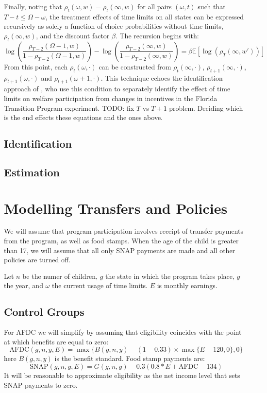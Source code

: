 \documentclass[12pt]{article}
\newcommand\EE{\mathbb{E}}
\numberwithin{equation}{section}
\numberwithin{figure}{section}
\numberwithin{table}{section}
\begin{document}
Finally, noting that $\rho_t(\omega,w) = \rho_t(\infty,w)$ for all pairs $(\omega,t)$ such that $T-t\leq\Omega-\omega$, the treatment effects of time limits on all states can be expressed recursively as solely a function of choice probabilities without time limits, $\rho_t(\infty,w)$, and the discount factor $\beta$. The recursion begins with:
\[
\log\left(\frac{\rho_{T-2}(\Omega-1,w)}{1-\rho_{T-2}(\Omega-1,w)}\right)-\log\left(\frac{\rho_{T-2}(\infty,w)}{1-\rho_{T-2}(\infty,w)}\right) = \beta\EE[\log(\rho_{T}(\infty,w'))]
\]
From this point, each $\rho_{t}(\omega,\cdot)$ can be constructed from $\rho_{t}(\infty,\cdot)$, $\rho_{t+1}(\infty,\cdot)$, $\rho_{t+1}(\omega,\cdot)$ and $\rho_{t+1}(\omega+1,\cdot)$.
This technique echoes the identification approach of \cite{GroggerMichal2003}, who use this condition to separately identify the effect of time limits on welfare participation from changes in incentives in the Florida Transition Program experiment.
{\color{red} TODO: fix $T$ vs $T+1$ problem. Deciding which is the end effects these equations and the ones above. }


\subsection{Identification}

\subsection{Estimation}

\section{Modelling Transfers and Policies}
We will assume that program participation involves receipt of transfer payments from the program, as well as food stamps. When the age of the child is greater than 17, we will assume that all only SNAP payments are made and all other policies are turned off.

Let $n$ be the numer of children, $g$ the state in which the program takes place, $y$ the year, and $\omega$ the current usage of time limits. $E$ is monthly earnings.

\subsection{Control Groups}
For AFDC we will simplify by assuming that eligibility coincides with the point at which benefits are equal to zero:
\[\text{AFDC}(g,n,y,E) = \max\{B(g,n,y) - (1-0.33)\times\max\{E - 120,0\},0\} \]
here $B(g,n,y)$ is the benefit standard.
Food stamp payments are:
\[\text{SNAP}(g,n,y,E) = G(g,n,y) - 0.3(0.8*E + \text{AFDC} - 134)\]
It will be reasonable to approximate eligibility as the net income level that sets SNAP payments to zero.
\end{document}
